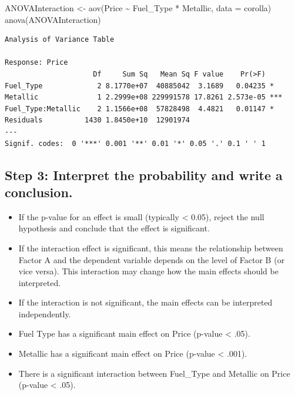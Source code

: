 \documentclass[
  letterpaper,
  DIV=11,
  numbers=noendperiod]{scrreprt}
\newenvironment{Shaded}{\begin{snugshade}}{\end{snugshade}}
\newcommand{\AttributeTok}[1]{\textcolor[rgb]{0.40,0.45,0.13}{#1}}
\newcommand{\FunctionTok}[1]{\textcolor[rgb]{0.28,0.35,0.67}{#1}}
\newcommand{\NormalTok}[1]{\textcolor[rgb]{0.00,0.23,0.31}{#1}}
\newcommand{\OtherTok}[1]{\textcolor[rgb]{0.00,0.23,0.31}{#1}}
\newcommand{\SpecialCharTok}[1]{\textcolor[rgb]{0.37,0.37,0.37}{#1}}
\begin{document}
\begin{Shaded}
\begin{Highlighting}[]
\NormalTok{ANOVAInteraction }\OtherTok{\textless{}{-}} \FunctionTok{aov}\NormalTok{(Price }\SpecialCharTok{\textasciitilde{}}\NormalTok{ Fuel\_Type }\SpecialCharTok{*}\NormalTok{ Metallic, }\AttributeTok{data =}\NormalTok{ corolla)}
\FunctionTok{anova}\NormalTok{(ANOVAInteraction)}
\end{Highlighting}
\end{Shaded}

\begin{verbatim}
Analysis of Variance Table

Response: Price
                     Df     Sum Sq   Mean Sq F value    Pr(>F)    
Fuel_Type             2 8.1770e+07  40885042  3.1689   0.04235 *  
Metallic              1 2.2999e+08 229991578 17.8261 2.573e-05 ***
Fuel_Type:Metallic    2 1.1566e+08  57828498  4.4821   0.01147 *  
Residuals          1430 1.8450e+10  12901974                      
---
Signif. codes:  0 '***' 0.001 '**' 0.01 '*' 0.05 '.' 0.1 ' ' 1
\end{verbatim}

\subsection{Step 3: Interpret the probability and write a
conclusion.}\label{step-3-interpret-the-probability-and-write-a-conclusion.-1}

\begin{itemize}
\item
  If the p-value for an effect is small (typically \textless{} 0.05),
  reject the null hypothesis and conclude that the effect is
  significant.
\item
  If the interaction effect is significant, this means the relationship
  between Factor A and the dependent variable depends on the level of
  Factor B (or vice versa). This interaction may change how the main
  effects should be interpreted.
\item
  If the interaction is not significant, the main effects can be
  interpreted independently.
\item
  Fuel Type has a significant main effect on Price (p-value \textless{}
  .05).
\item
  Metallic has a significant main effect on Price (p-value \textless{}
  .001).
\item
  There is a significant interaction between Fuel\_Type and Metallic on
  Price (p-value \textless{} .05).
\end{itemize}
\end{document}
